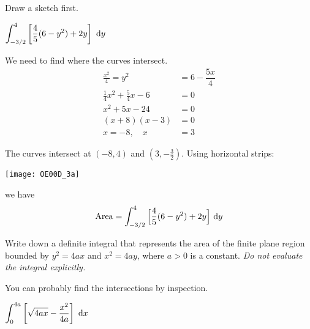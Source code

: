\begin{hint}
Draw a sketch first.
\end{hint}

\begin{answer}
$\displaystyle \int_{-3/2}^{4}\left[\frac{4}{5}(6-y^2)+2y\right]\ \mathrm{d}y$
\end{answer}

\begin{solution}
We need to find where the curves intersect.
\begin{align*}
\frac{x^2}{4}=y^2&=6-\dfrac{5x}{4}\\
\frac{1}{4}x^2+\frac{5}{4}x-6&=0\\
x^2+5x-24&=0\\
(x+8)(x-3)&=0\\
x=-8,\quad x&=3
\end{align*}

The curves intersect at $(-8,4)$ and $(3,-\frac{3}{2})$.  Using horizontal
strips:
\begin{center}
       \texttt{[image: OE00D\_3a]}
\end{center}
we have
\begin{align*}
\text{Area} = \int_{-3/2}^{4}\Big[\frac{4}{5}(6-y^2)+2y\Big]\ \mathrm{d}y
\end{align*}

\end{solution}


\begin{question}[2001A]\label{1.5_4ax4ay}
Write down a definite integral that represents the
area of the finite plane region bounded by $y^2=4ax$ and
$x^2=4ay$, where $a>0$ is a constant.
\emph{Do not evaluate the integral explicitly.}
\end{question}

\begin{hint}
You can probably find the intersections by inspection.
\end{hint}

\begin{answer}
$ \displaystyle\int_0^{4a}\left[\sqrt{4ax}-\frac{x^2}{4a}\right]\ \dee{x}$
\end{answer}

